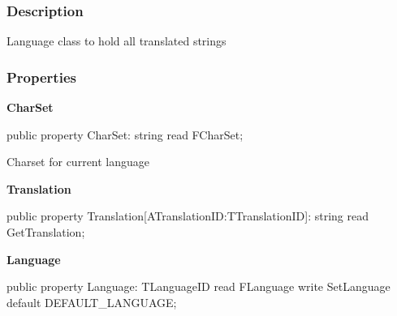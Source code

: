 \documentclass{report}
\newif\ifpdf
\begin{document}
\subsubsection*{\large{\textbf{Description}}\normalsize\hspace{1ex}\hfill}
Language class to hold all translated strings\subsubsection*{\large{\textbf{Properties}}\normalsize\hspace{1ex}\hfill}
\begin{list}{}{
\setlength{\itemindent}{0cm}
\setlength{\listparindent}{0cm}
\setlength{\leftmargin}{\evensidemargin}
\addtolength{\leftmargin}{\tmplength}
\settowidth{\labelsep}{X}
\addtolength{\leftmargin}{\labelsep}
\setlength{\labelwidth}{\tmplength}
}
\label{PasDoc_Languages.TPasDocLanguages-CharSet}
\item[\textbf{CharSet}\hfill]
\ifpdf
\begin{flushleft}
\fi
\begin{ttfamily}
public property CharSet: string read FCharSet;\end{ttfamily}

\ifpdf
\end{flushleft}
\fi


\par Charset for current language\label{PasDoc_Languages.TPasDocLanguages-Translation}
\item[\textbf{Translation}\hfill]
\ifpdf
\begin{flushleft}
\fi
\begin{ttfamily}
public property Translation[ATranslationID:TTranslationID]: string read GetTranslation;\end{ttfamily}

\ifpdf
\end{flushleft}
\fi


\par  \label{PasDoc_Languages.TPasDocLanguages-Language}
\item[\textbf{Language}\hfill]
\ifpdf
\begin{flushleft}
\fi
\begin{ttfamily}
public property Language: TLanguageID read FLanguage write SetLanguage
      default DEFAULT{\_}LANGUAGE;\end{ttfamily}

\ifpdf
\end{flushleft}
\fi


\par  \end{list}
\end{document}
